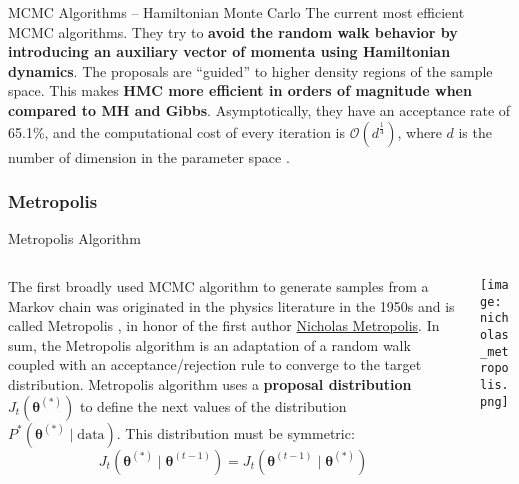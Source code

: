 \begin{frame}{MCMC Algorithms -- Hamiltonian Monte Carlo}
	The current most efficient MCMC algorithms.
	They try to \textbf{avoid the random walk behavior by introducing an auxiliary vector of momenta
		using Hamiltonian dynamics}.
	The proposals are ``guided'' to higher density regions of the sample space.
	This makes \textbf{HMC more efficient in orders of magnitude when compared to MH and Gibbs}.
	\vfill
	Asymptotically, they have an acceptance rate of 65.1\%,
	and the computational cost of every iteration is $\mathcal{O}(d^{\frac{1}{4}})$,
	where $d$ is the number of dimension in the parameter space \parencite{beskosOptimalTuningHybrid2013}.
\end{frame}

\subsubsection{Metropolis}
\begin{frame}{Metropolis Algorithm}
	\begin{columns}
		\begin{column}{0.8\textwidth}
			The first broadly used MCMC algorithm to generate samples from a Markov chain
			was originated in the physics literature in the 1950s and is called Metropolis
			\parencite{metropolisEquationStateCalculations1953},
			in honor of the first author
			\href{https://en.wikipedia.org/wiki/Nicholas_Metropolis}{Nicholas Metropolis}.
			\vfill
			In sum, the Metropolis algorithm is an adaptation of a random walk coupled
			with an acceptance/rejection rule to converge to the target distribution.
			\vfill
			Metropolis algorithm uses a \textbf{proposal distribution}
			$J_t(\boldsymbol{\theta}^{(*)})$
			to define the next values of the distribution
			$P^*(\boldsymbol{\theta}^{(*)} \mid \text{data})$.
			This distribution must be symmetric:
			$$
				J_t (\boldsymbol{\theta}^{(*)} \mid \boldsymbol{\theta}^{(t-1)}) = J_t(\boldsymbol{\theta}^{(t-1)} \mid \boldsymbol{\theta}^{(*)})
			$$
		\end{column}
		\begin{column}{0.2\textwidth}
			\centering
			\texttt{[image: nicholas\_metropolis.png]}
		\end{column}
	\end{columns}
\end{frame}

